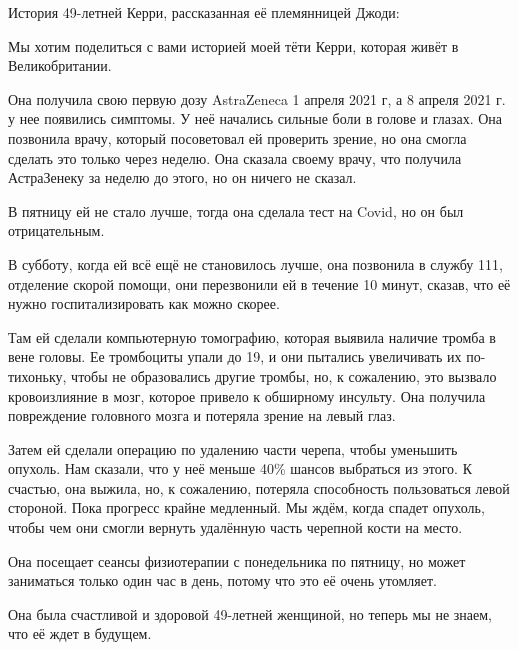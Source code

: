 История 49-летней Керри, рассказанная её племянницей Джоди:

Мы хотим поделиться с вами историей моей тёти Керри, которая живёт в
Великобритании.

Она получила свою первую дозу AstraZeneca 1 апреля 2021 г, а 8 апреля 2021 г. у
нее появились симптомы. У неё начались сильные боли в голове и глазах. Она
позвонила врачу, который посоветовал ей проверить зрение, но она смогла сделать
это только через неделю. Она сказала своему врачу, что получила АстраЗенеку за
неделю до этого, но он ничего не сказал.

В пятницу ей не стало лучше, тогда она сделала тест на Covid, но он был
отрицательным.

В субботу, когда ей всё ещё не становилось лучше, она позвонила в службу 111,
отделение скорой помощи, они перезвонили ей в течение 10 минут, сказав, что её
нужно госпитализировать как можно скорее.

Там ей сделали компьютерную томографию, которая выявила наличие тромба в вене
головы. Ее тромбоциты упали до 19, и они пытались увеличивать их по-тихоньку,
чтобы не образовались другие тромбы, но, к сожалению, это вызвало кровоизлияние
в мозг, которое привело к обширному инсульту. Она получила повреждение головного
мозга и потеряла зрение на левый глаз.

Затем ей сделали операцию по удалению части черепа, чтобы уменьшить опухоль. Нам
сказали, что у неё меньше 40\% шансов выбраться из этого. К счастью, она выжила,
но, к сожалению, потеряла способность пользоваться левой стороной. Пока прогресс
крайне медленный. Мы ждём, когда спадет опухоль, чтобы чем они смогли вернуть
удалённую часть черепной кости на место.

Она посещает сеансы физиотерапии с понедельника по пятницу, но может заниматься
только один час в день, потому что это её очень утомляет.

Она была счастливой и здоровой 49-летней женщиной, но теперь мы не знаем, что её
ждет в будущем.
